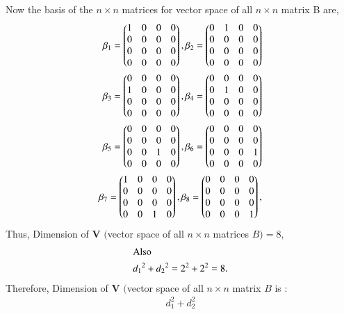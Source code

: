 Now the basis of the $n \times n $  matrices for vector space of all $n \times n$ matrix B are,
\begin{align}
\beta_1 =  \begin{pmatrix}
1 & 0  & 0 & 0 \\ 
0 & 0  & 0 & 0  \\
0 & 0  & 0 & 0  \\
0 & 0  & 0 & 0  \\  
\end{pmatrix},
 \beta_2 =  \begin{pmatrix}
0 & 1  & 0 & 0 \\ 
0 & 0  & 0 & 0  \\
0 & 0  & 0 & 0  \\
0 & 0  & 0 & 0  \\  
\end{pmatrix}\\
\beta_3 =  \begin{pmatrix}
0 & 0  & 0 & 0 \\ 
1 & 0  & 0 & 0  \\
0 & 0  & 0 & 0  \\
0 & 0  & 0 & 0  \\  
\end{pmatrix},
\beta_4 =  \begin{pmatrix}
0 & 0  & 0 & 0 \\ 
0 & 1  & 0 & 0  \\
0 & 0  & 0 & 0  \\
0 & 0  & 0 & 0   \\ 
\end{pmatrix}\\
\beta_5 =  \begin{pmatrix}
0 & 0  & 0 & 0 \\ 
0 & 0  & 0 & 0  \\
0 & 0  & 1 & 0  \\
0 & 0  & 0 & 0\\    
\end{pmatrix},
\beta_6 =  \begin{pmatrix}
0 & 0  & 0 & 0 \\ 
0 & 0  & 0 & 0  \\
0 & 0  & 0 & 1  \\
0 & 0  & 0 & 0  \\  
\end{pmatrix}\\
\beta_7 =  \begin{pmatrix}
1 & 0  & 0 & 0 \\ 
0 & 0  & 0 & 0  \\
0 & 0  & 0 & 0  \\
0 & 0  & 1 & 0   \\ 
\end{pmatrix},
\beta_8 =  \begin{pmatrix}
0 & 0  & 0 & 0 \\ 
0 & 0  & 0 & 0  \\
0 & 0  & 0 & 0  \\
0 & 0  & 0 & 1   \\ 
\end{pmatrix},
\end{align}
Thus, Dimension of $\mathbf{V}$ $($vector space of all $n \times n$ matrices $ B ) = 8,$
\begin{align}
\intertext{Also}
 {d_1}^{2} + d{_2}^2 = 2^{2}+2^{2} = 8. 
 \end{align}
Therefore, Dimension of $\mathbf{V}$ $($vector space of all $ n \times n$ matrix $B$ is :
\begin{align}
 d_1^2+d_2^2
 \end{align}
